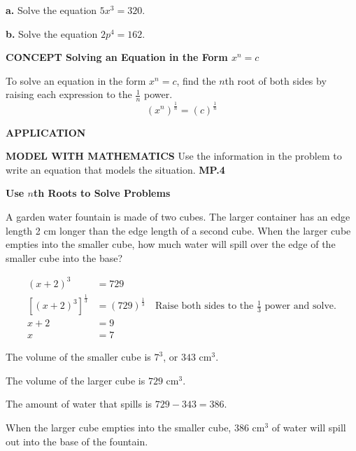 \documentclass{article}
\newenvironment{concept-box}{}{}
\newenvironment{example}[1]{}{}
\newenvironment{tryit}[1]{}{}
\newcommand{\placeholder}[2]{}
\begin{document}
\begin{tryit}{5}
\textbf{a.} Solve the equation $5x^3 = 320$.

\textbf{b.} Solve the equation $2p^4 = 162$.
\end{tryit}

\begin{concept-box}
\textbf{CONCEPT Solving an Equation in the Form $x^n = c$}

To solve an equation in the form $x^n = c$, find the $n$th root of both sides by raising each expression to the $\frac{1}{n}$ power.
\[ (x^n)^{\frac{1}{n}} = (c)^{\frac{1}{n}} \]
\end{concept-box}

\textbf{APPLICATION}

\textbf{MODEL WITH MATHEMATICS}
Use the information in the problem to write an equation that models the situation. \textbf{MP.4}

\begin{example}{6}
\textbf{Use $n$th Roots to Solve Problems}

A garden water fountain is made of two cubes. The larger container has an edge length 2 cm longer than the edge length of a second cube. When the larger cube empties into the smaller cube, how much water will spill over the edge of the smaller cube into the base?

\placeholder{illustration}{A garden water fountain made of a smaller cube sitting on a larger cube. Water flows into the smaller cube and spills over into the larger one. Label 'The volume of the larger cube is 729 cm$^3$'.}

\begin{align*}
(x + 2)^3 &= 729 \\
[(x + 2)^3]^{\frac{1}{3}} &= (729)^{\frac{1}{3}} \quad \text{Raise both sides to the } \frac{1}{3} \text{ power and solve.} \\
x + 2 &= 9 \\
x &= 7
\end{align*}

The volume of the smaller cube is $7^3$, or $343 \text{ cm}^3$.

The volume of the larger cube is $729 \text{ cm}^3$.

The amount of water that spills is $729 - 343 = 386$.

When the larger cube empties into the smaller cube, $386 \text{ cm}^3$ of water will spill out into the base of the fountain.
\end{example}
\end{document}
